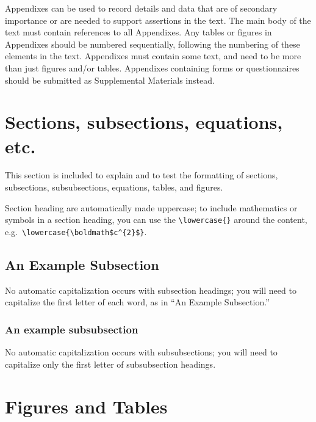 \documentclass[
  NewProceedings,
  letterpaper]{./assets/ascelike-new}
\begin{document}
Appendixes can be used to record details and data that are of secondary
importance or are needed to support assertions in the text. The main
body of the text must contain references to all Appendixes. Any tables
or figures in Appendixes should be numbered sequentially, following the
numbering of these elements in the text. Appendixes must contain some
text, and need to be more than just figures and/or tables. Appendixes
containing forms or questionnaires should be submitted as Supplemental
Materials instead.

\hypertarget{sections-subsections-equations-etc.}{%
\section{Sections, subsections, equations,
etc.}\label{sections-subsections-equations-etc.}}

This section is included to explain and to test the formatting of
sections, subsections, subsubsections, equations, tables, and figures.

Section heading are automatically made uppercase; to include mathematics
or symbols in a section heading, you can use the
\texttt{\textbackslash{}lowercase\{\}} around the content,
e.g.~\texttt{\textbackslash{}lowercase\{\textbackslash{}boldmath\$c\^{}\{2\}\$\}}.

\hypertarget{an-example-subsection}{%
\subsection{An Example Subsection}\label{an-example-subsection}}

No automatic capitalization occurs with subsection headings; you will
need to capitalize the first letter of each word, as in ``An Example
Subsection.''

\hypertarget{an-example-subsubsection}{%
\subsubsection{An example
subsubsection}\label{an-example-subsubsection}}

No automatic capitalization occurs with subsubsections; you will need to
capitalize only the first letter of subsubsection headings.

\hypertarget{figures-and-tables}{%
\section{Figures and Tables}\label{figures-and-tables}}
\end{document}
